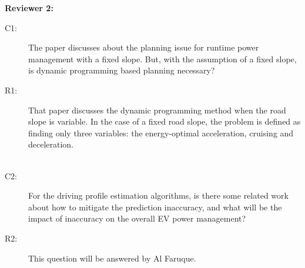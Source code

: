 \documentclass[onecolumn]{IEEEconf}
\begin{document}
\textbf{Reviewer 2:}
\begin{description}
\item [C1: ] The paper discusses about the planning issue for runtime power management with a fixed slope. But, with the assumption of a fixed slope, is dynamic programming based planning necessary?
\item [R1: ] That paper discusses the dynamic programming method when the road slope is variable. In the case of a fixed road slope, the problem is defined as finding only three variables: the energy-optimal acceleration, cruising and deceleration.\\
~\\

\item [C2: ] For the driving profile estimation algorithms, is there some related work about how to mitigate the prediction inaccuracy, and what will be the impact of inaccuracy on the overall EV power management?
\item [R2: ] 

This question will be answered by Al Faruque. 




~\\


\end{description}
\end{document}
